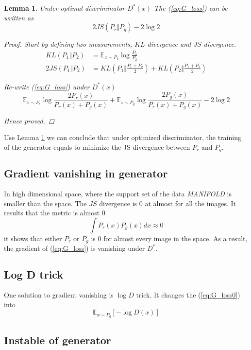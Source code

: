 \documentclass[a4paper]{article}
\newtheorem{lemma}{Lemma}[section]
\begin{document}
\begin{lemma}
    Under optimal discriminator $D^*(x)$ The (\ref{eq:G_loss}) can be written as
    \begin{equation*}
        2 JS(P_r \Vert P_g) - 2 \log{2}
    \end{equation*}
    \begin{proof}
        Start by defining two measurements, $KL$ divergence and $JS$ divergence.
        \begin{equation*}
            \begin{aligned}
                KL(P_1 \Vert P_2)   & = \mathbb{E}_{x\sim P_1} \log{\frac{P_1}{P_2}}                      \\
                2 JS(P_1 \Vert P_2) & = KL(P_1 \Vert \frac{P_1+P_2}{2}) + KL(P_2 \Vert \frac{P_1+P_2}{2})
            \end{aligned}
        \end{equation*}

        Re-write (\ref{eq:G_loss}) under $D^*(x)$
        \begin{equation*}
            \mathbb{E}_{x\sim P_r} \log{\frac{2 P_r(x)}{P_r(x) + P_g(x)}}
            + \mathbb{E}_{x\sim P_g} \log{\frac{2 P_g(x)}{P_r(x) + P_g(x)}}
            - 2 \log {2}
        \end{equation*}

        Hence proved.
    \end{proof}
    \label{le:G_loss_in_JS}
\end{lemma}

Use Lemma \ref{le:G_loss_in_JS} we can conclude that under optimized discriminator, the training of the generator equals to minimize the JS divergence between $P_r$ and $P_g$.

\subsection{Gradient vanishing in generator}
In high dimensional space, where the support set of the data \emph{MANIFOLD} is smaller than the space.
The $JS$ divergence is $0$ at almost for all the images.
It results that the metric is almost $0$
\begin{equation}
    \int P_r(x) P_g(x) dx \approx 0
\end{equation}
it shows that either $P_r$ or $P_g$ is $0$ for almost every image in the space.
As a result, the gradient of (\ref{eq:G_loss}) is vanishing under $D^*$.

\subsection{Log D trick}
One solution to gradient vanishing is $\log D$ trick.
It changes the (\ref{eq:G_loss0}) into
\begin{equation}
    \mathbb{E}_{x\sim P_g} [- \log{D(x)}]
\end{equation}

\subsection{Instable of generator}
\end{document}
